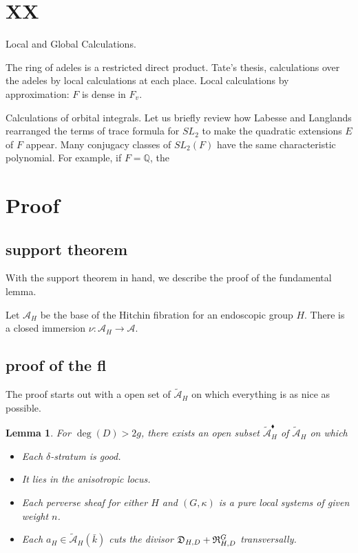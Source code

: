 \documentclass[brochure,english,12pt]{bourbaki}
\newtheorem{lemma}[equation]{Lemma}
\newcommand{\ring}[1]{\mathbb{#1}}
\def\A{{\mathcal A}}
\def\tA{{\tilde{\mathcal A}}}
\def\D{{\frak{D}}}
\def\R{{\frak{R}}}
\def\diamond{{\blacklozenge}}
\begin{document}
\section{XX}
Local and Global Calculations.

The ring of adeles is a restricted direct product.  Tate's thesis,
calculations over the adeles by local calculations at each place.
Local calculations by approximation: $F$ is dense in $F_v$.


Calculations of orbital integrals.  Let us briefly review how Labesse
and Langlands rearranged the terms of trace formula for $SL_2$ to make
the quadratic extensions $E$ of $F$ appear.  Many conjugacy classes of
$SL_2(F)$ have the same characteristic polynomial.  For example, if
$F=\ring{Q}$, the

\section{Proof} %

\subsection{support theorem}



With the support theorem in hand, we describe the proof of the fundamental lemma.

Let $\A_H$ be the base of the Hitchin fibration for an endoscopic group $H$.  There
is a closed immersion $\nu:\A_H\to\A$.

\subsection{proof of the fl}

The proof starts out with a open set of $\tA_H$ on which everything is as nice as possible.

\begin{lemma}  For $\deg(D)>2g$, 
there exists an open subset $\tA_H^{\diamond}$ of $\tA_H$ on which
\begin{itemize}
\item Each $\delta$-stratum is good.
\item It lies in the anisotropic locus.
\item Each  perverse sheaf for either $H$ and $(G,\kappa)$ is a pure local systems of given weight $n$.
\item Each $a_H\in \tA_H(\bar k)$ cuts the divisor $\D_{H,D}+\R^G_{H,D}$ transversally.
\end{itemize}
\end{lemma}
\end{document}
